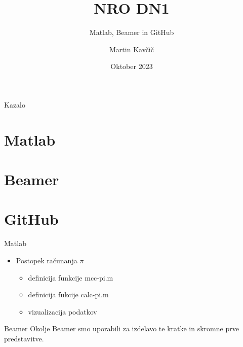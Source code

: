 \documentclass{beamer}
\title{NRO DN1}
\subtitle{Matlab, Beamer in GitHub}
\author{Martin Kavčič}
\institute{Univerza v Ljubljani Fakulteta za strojništvo}
\date{Oktober 2023}
\begin{document}
\begin{frame}
    \titlepage
\end{frame}

\begin{frame}{Kazalo}
    \tableofcontents
\end{frame}

\section{Matlab}
\section{Beamer}
\section{GitHub}

\begin{frame}{Matlab}
   
\begin{itemize}
    \item Postopek računanja $\pi$
    \pause
\begin{itemize}
    \item definicija funkcije mcc-pi.m
    \pause
    \item definicija fukcije calc-pi.m
    \pause
    \item vizualizacija podatkov
\end{itemize}
    
\end{itemize}
\end{frame}

\begin{frame}{Beamer}
 Okolje Beamer smo uporabili za izdelavo te kratke in skromne prve predstavitve.    
\end{frame}
\end{document}
